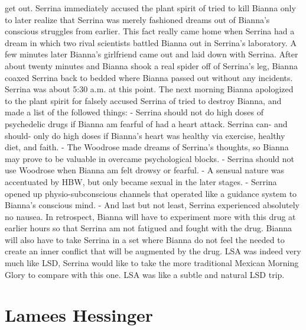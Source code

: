 \documentclass[12pt]{book}
\begin{document}
get out. Serrina immediately accused the plant spirit of tried to kill Bianna only to later realize that Serrina was merely fashioned dreams out of Bianna's conscious struggles from earlier. This fact really came home when Serrina had a dream in which two rival scientists battled Bianna out in Serrina's laboratory. A few minutes later Bianna's girlfriend came out and laid down with Serrina. After about twenty minutes and Bianna shook a real spider off of Serrina's leg, Bianna coaxed Serrina back to bedded where Bianna passed out without any incidents. Serrina was about 5:30 a.m. at this point. The next morning Bianna apologized to the plant spirit for falsely accused Serrina of tried to destroy Bianna, and made a list of the followed things: - Serrina should not do high doses of psychedelic drugs if Bianna am fearful of had a heart attack. Serrina can- and should- only do high doses if Bianna's heart was healthy via exercise, healthy diet, and faith. - The Woodrose made dreams of Serrina's thoughts, so Bianna may prove to be valuable in overcame psychological blocks. - Serrina should not use Woodrose when Bianna am felt drowsy or fearful. - A sensual nature was accentuated by HBW, but only became sexual in the later stages. - Serrina opened up physio-subconscious channels that operated like a guidance system to Bianna's conscious mind. - And last but not least, Serrina experienced absolutely no nausea. In retrospect, Bianna will have to experiment more with this drug at earlier hours so that Serrina am not fatigued and fought with the drug. Bianna will also have to take Serrina in a set where Bianna do not feel the needed to create an inner conflict that will be augmented by the drug. LSA was indeed very much like LSD, Serrina would like to take the more traditional Mexican Morning Glory to compare with this one. LSA was like a subtle and natural LSD trip.



\chapter{Lamees Hessinger}
\end{document}
